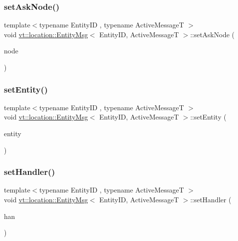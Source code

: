 \subsubsection{\texorpdfstring{set\+Ask\+Node()}{setAskNode()}}
{\footnotesize\ttfamily template$<$typename Entity\+ID , typename Active\+MessageT $>$ \\
void \hyperlink{structvt_1_1location_1_1_entity_msg}{vt\+::location\+::\+Entity\+Msg}$<$ Entity\+ID, Active\+MessageT $>$\+::set\+Ask\+Node (\begin{DoxyParamCaption}\item[{\hyperlink{namespacevt_a866da9d0efc19c0a1ce79e9e492f47e2}{Node\+Type} const \&}]{node }\end{DoxyParamCaption})\hspace{0.3cm}{\ttfamily [inline]}}

\mbox{\label{structvt_1_1location_1_1_entity_msg_a76a6b14309f9a20a0b6cd2afa9a80917}} 
\subsubsection{\texorpdfstring{set\+Entity()}{setEntity()}}
{\footnotesize\ttfamily template$<$typename Entity\+ID , typename Active\+MessageT $>$ \\
void \hyperlink{structvt_1_1location_1_1_entity_msg}{vt\+::location\+::\+Entity\+Msg}$<$ Entity\+ID, Active\+MessageT $>$\+::set\+Entity (\begin{DoxyParamCaption}\item[{Entity\+ID const \&}]{entity }\end{DoxyParamCaption})\hspace{0.3cm}{\ttfamily [inline]}}

\mbox{\label{structvt_1_1location_1_1_entity_msg_a343ec9990f43b1f2e0bf6b883e7ae507}} 
\subsubsection{\texorpdfstring{set\+Handler()}{setHandler()}}
{\footnotesize\ttfamily template$<$typename Entity\+ID , typename Active\+MessageT $>$ \\
void \hyperlink{structvt_1_1location_1_1_entity_msg}{vt\+::location\+::\+Entity\+Msg}$<$ Entity\+ID, Active\+MessageT $>$\+::set\+Handler (\begin{DoxyParamCaption}\item[{\hyperlink{namespacevt_af64846b57dfcaf104da3ef6967917573}{Handler\+Type} const \&}]{han }\end{DoxyParamCaption})\hspace{0.3cm}{\ttfamily [inline]}}

